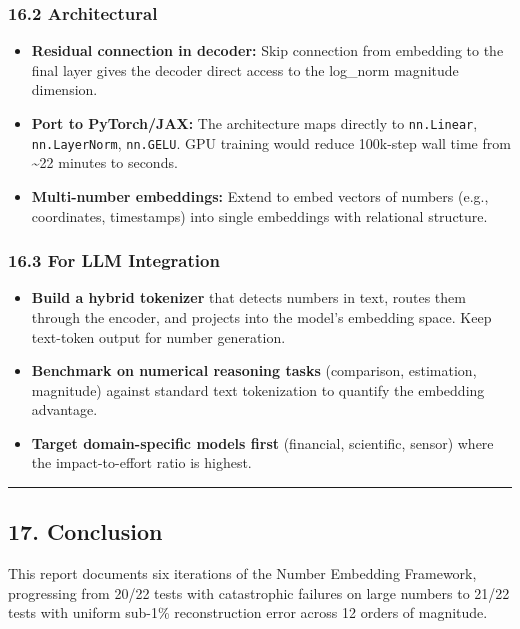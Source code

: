 \documentclass[11pt]{article}
\begin{document}
\subsubsection*{16.2 Architectural}


\begin{itemize}
\item \textbf{Residual connection in decoder:} Skip connection from embedding to the final layer gives the decoder direct access to the log\_norm magnitude dimension.
\item \textbf{Port to PyTorch/JAX:} The architecture maps directly to \texttt{nn.Linear}, \texttt{nn.LayerNorm}, \texttt{nn.GELU}. GPU training would reduce 100k-step wall time from \textasciitilde{}22 minutes to seconds.
\item \textbf{Multi-number embeddings:} Extend to embed vectors of numbers (e.g., coordinates, timestamps) into single embeddings with relational structure.
\end{itemize}


\subsubsection*{16.3 For LLM Integration}


\begin{itemize}
\item \textbf{Build a hybrid tokenizer} that detects numbers in text, routes them through the encoder, and projects into the model's embedding space. Keep text-token output for number generation.
\item \textbf{Benchmark on numerical reasoning tasks} (comparison, estimation, magnitude) against standard text tokenization to quantify the embedding advantage.
\item \textbf{Target domain-specific models first} (financial, scientific, sensor) where the impact-to-effort ratio is highest.
\end{itemize}


\noindent\rule{\textwidth}{0.4pt}


\subsection*{17. Conclusion}


This report documents six iterations of the Number Embedding Framework, progressing from 20/22 tests with catastrophic failures on large numbers to 21/22 tests with uniform sub-1\% reconstruction error across 12 orders of magnitude.
\end{document}
